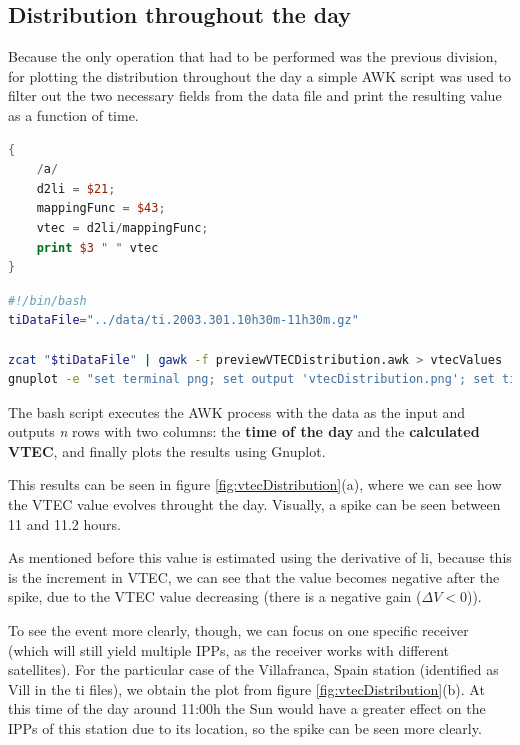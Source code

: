 \subsection{Distribution throughout the day}

Because the only operation that had to be performed was the previous division, for plotting the distribution throughout the day a simple AWK script was used to filter out the two necessary fields from the data file and print the resulting value as a function of time. 

\begin{minipage}{\linewidth}
\begin{lstlisting}[language=Awk, caption=AWK script to estimate the VTEC]
{
	/a/
	d2li = $21;
	mappingFunc = $43;
	vtec = d2li/mappingFunc;
	print $3 " " vtec
}
\end{lstlisting}
\end{minipage}

\begin{minipage}{\linewidth}
\begin{lstlisting}[language=Bash, caption=Bash script to execute the procedures]
#!/bin/bash
tiDataFile="../data/ti.2003.301.10h30m-11h30m.gz"

zcat "$tiDataFile" | gawk -f previewVTECDistribution.awk > vtecValues
gnuplot -e "set terminal png; set output 'vtecDistribution.png'; set title 'VTEC Distribution'; set xlabel 'Time of the day (hours)'; set ylabel 'VTEC'; set grid; plot \"vtecValues\" using 1:2 with point"
\end{lstlisting}
\end{minipage}


The bash script executes the AWK process with the data as the input and outputs \textit{n} rows with two columns: the \textbf{time of the day} and the \textbf{calculated VTEC}, and finally plots the results using Gnuplot. 

This results can be seen in figure \ref{fig:vtecDistribution}(a), where we can see how the VTEC value evolves throught the day. Visually, a spike can be seen between 11 and 11.2 hours. 

As mentioned before this value is estimated using the derivative of li, because this is the increment in VTEC, we can see that the value becomes negative after the spike, due to the VTEC value decreasing (there is a negative gain ($\Delta V < 0$)).

To see the event more clearly, though, we can focus on one specific receiver (which will still yield multiple IPPs, as the receiver works with different satellites). For the particular case of the Villafranca, Spain station (identified as Vill in the ti files), we obtain the plot from figure \ref{fig:vtecDistribution}(b). At this time of the day around 11:00h the Sun would have a greater effect on the IPPs of this station due to its location, so the spike can be seen more clearly. 

